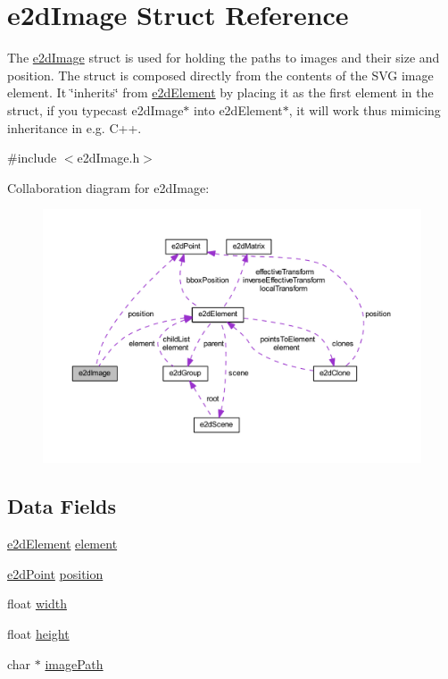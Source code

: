 \hypertarget{structe2dImage}{\section{e2d\-Image Struct Reference}
\label{structe2dImage}
}


The \hyperlink{structe2dImage}{e2d\-Image} struct is used for holding the paths to images and their size and position. The struct is composed directly from the contents of the S\-V\-G image element. It \char`\"{}inherits\char`\"{} from \hyperlink{structe2dElement}{e2d\-Element} by placing it as the first element in the struct, if you typecast e2d\-Image$\ast$ into e2d\-Element$\ast$, it will work thus mimicing inheritance in e.\-g. C++.  




{\ttfamily \#include $<$e2d\-Image.\-h$>$}



Collaboration diagram for e2d\-Image\-:\nopagebreak
\begin{figure}[H]
\begin{center}
\leavevmode
\includegraphics[width=350pt]{structe2dImage__coll__graph}
\end{center}
\end{figure}
\subsection*{Data Fields}
\begin{DoxyCompactItemize}
\item 
\hyperlink{structe2dElement}{e2d\-Element} \hyperlink{structe2dImage_a55bc7a3a0af41fba9e5b91f390c5928c}{element}
\item 
\hyperlink{structe2dPoint}{e2d\-Point} \hyperlink{structe2dImage_afa8983f25fd6aa6aca18feb07d8d2249}{position}
\item 
float \hyperlink{structe2dImage_ae426f00e82704fa09578f5446e22d915}{width}
\item 
float \hyperlink{structe2dImage_a48083b65ac9a863566dc3e3fff09a5b4}{height}
\item 
char $\ast$ \hyperlink{structe2dImage_afb14ab23ba86115c3b01ad4122943f89}{image\-Path}
\end{DoxyCompactItemize}


